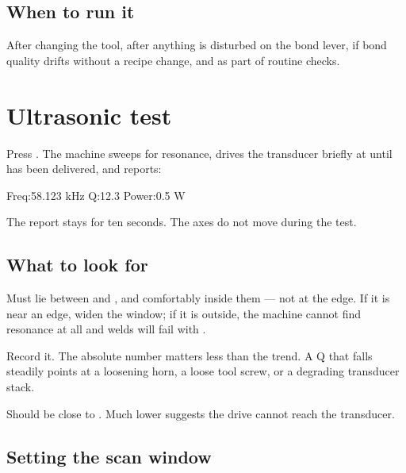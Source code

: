 \subsection*{When to run it}

After changing the tool, after anything is disturbed on the bond lever, if bond
quality drifts without a recipe change, and as part of routine checks.

\section{Ultrasonic test}
\label{sec:us-test}

Press . The machine sweeps for resonance, drives the transducer
briefly at  until  has been
delivered, and reports:

\begin{lcdscreen}
\begin{lcdverb}
Freq:58.123 kHz
Q:12.3
Power:0.5 W
\end{lcdverb}
\end{lcdscreen}

The report stays for ten seconds. The axes do not move during the test.

\subsection*{What to look for}

\begin{description}[leftmargin=!,labelwidth=26mm,style=nextline,font=\normalfont\bfseries]
\item[Frequency] Must lie between  and
  , and comfortably inside them --- not at the edge. If it
  is near an edge, widen the window; if it is outside, the machine cannot find
  resonance at all and welds will fail with .
\item[Q] Record it. The absolute number matters less than the trend. A Q that
  falls steadily points at a loosening horn, a loose tool screw, or a
  degrading transducer stack.
\item[Power] Should be close to . Much lower suggests the
  drive cannot reach the transducer.
\end{description}

\subsection*{Setting the scan window}

